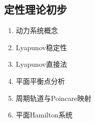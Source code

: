 \subsection{定性理论初步}
\begin{enumerate}
    \item 动力系统概念
    \item Lyapunov稳定性
    \item Lyapunov直接法
    \item 平面平衡点分析
    \item 周期轨道与Poincare映射
    \item 平面Hamilton系统
\end{enumerate}
